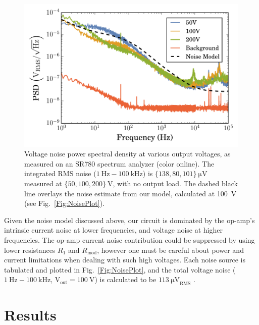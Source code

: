 \documentclass[aip,rsi,reprint]{revtex4-1} %
\begin{document}
\begin{figure}[b]
\includegraphics[width=\columnwidth]{VoltagePSD}
\caption{Voltage noise power spectral density at various output voltages, as measured on an SR780 spectrum analyzer (color online). The integrated RMS noise ($\SI{1}{\hertz} - \SI{100}{\kilo\hertz}$) is $\{138, 80, 101\}~\si{\micro\volt}$ measured at  $\{50, 100, 200\}~\si{\volt}$, with no output load. The dashed black line overlays the noise estimate from our model, calculated at \SI{100}{\volt} (see Fig.~\ref{Fig:NoisePlot}).\label{Fig:PSD}}
\end{figure}

Given the noise model discussed above, our circuit is dominated by the op-amp's intrinsic current noise at lower frequencies, and voltage noise at higher frequencies.
The op-amp current noise contribution could be suppressed by using lower resistances $R_1$ and $R_\text{mod}$, however one must be careful about power and current limitations when dealing with such high voltages.
Each noise source is tabulated and plotted in Fig.~\ref{Fig:NoisePlot}, and the total voltage noise ($\SI{1}{\hertz} - \SI{100}{\kilo\hertz}$, $\text{V}_\text{out} = \SI{100}{\volt}$) is calculated to be $\SI{113}{\micro\volt}_\text{RMS}$ .

\section{Results}
\label{Sec:Results}
\end{document}
